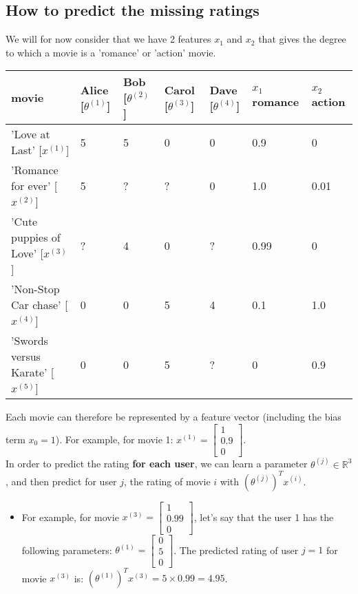 \documentclass[a4paper,12pt]{report}
\begin{document}
\subsection{How to predict the missing ratings}
We will for now consider that we have 2 features $x_1$ and $x_2$ that gives the degree to which a movie is a 'romance' or 'action' movie.
\begin{table}[H]
\begin{tabular}{|p{5cm}|p{2cm}|p{1.7cm}|p{2cm}|p{1.9cm}|| p{1.3cm} |p{1.3cm}|}
\hline
movie & Alice [$\theta^{(1)}$]  & Bob [$\theta^{(2)}$]& Carol [$\theta^{(3)}$] & Dave [$\theta^{(4)}$] & $x_1$ \small{romance}& $x_2$ \small{action}\\
\hline
'Love at Last' [$x^{(1)}$] & 5 & 5 & 0 & 0 & 0.9 & 0\\
\hline
'Romance for ever' [$x^{(2)}$] & 5 & ? & ? & 0 & 1.0 & 0.01\\
\hline
'Cute puppies of Love' [$x^{(3)}$] & ? & 4 & 0 & ?  & 0.99 & 0 \\
\hline
'Non-Stop Car chase' [$x^{(4)}$] & 0 & 0 & 5 & 4 & 0.1 & 1.0\\
\hline
'Swords versus Karate' [$x^{(5)}$] & 0 & 0 & 5 & ? & 0 & 0.9\\
\hline
\end{tabular}
\end{table}
Each movie can therefore be represented by a feature vector (including the bias term $x_0=1$). For example, for movie 1: $x^{(1)} = \left[ \begin{smallmatrix} 1 \\ 0.9 \\ 0 \end{smallmatrix} \right]$. \\
In order to predict the rating \textbf{for each user}, we can learn a parameter $\theta^{(j)} \in \mathbb{R}^3$, and then predict for user $j$, the rating of movie $i$ with $(\theta^{(j)})^T x^{(i)} $.
\begin{itemize}
\item For example, for movie $x^{(3)} = \left[ \begin{smallmatrix} 1 \\ 0.99 \\ 0 \end{smallmatrix} \right]$, let's say that the user 1 has the following parameters: $\theta ^{(1)} = \left[ \begin{smallmatrix} 0 \\ 5 \\ 0 \end{smallmatrix} \right]$. The predicted rating of user $j=1$ for movie $x^{(3)}$ is:  $(\theta^{(1)})^T x^{(3)} = 5 \times 0.99 = 4.95$. \\
\end{itemize}
\end{document}
